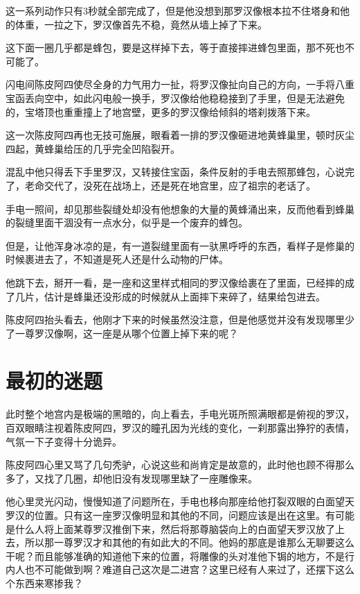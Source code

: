 这一系列动作只有3秒就全部完成了，但是他没想到那罗汉像根本拉不住塔身和他的体重，一拉之下，罗汉像首先不稳，竟然从墙上掉了下来。

这下面一圈几乎都是蜂包，要是这样掉下去，等于直接摔进蜂包里面，那不死也不可能了。

闪电间陈皮阿四使尽全身的力气用力一扯，将罗汉像扯向自己的方向，一手将八重宝函丢向空中，如此闪电般一换手，罗汉像给他稳稳接到了手里，但是无法避免的，宝塔顶也重重撞上了地宫壁，更多的罗汉像给倾斜的塔刹拨落下来。

这一次陈皮阿四再也无技可施展，眼看着一排的罗汉像砸进地黄蜂巢里，顿时灰尘四起，黄蜂巢给压的几乎完全凹陷裂开。

混乱中他只得丢下手里罗汉，又转接住宝函，条件反射的手电去照那蜂包，心说完了，老命交代了，没死在战场上，还是死在地宫里，应了祖宗的老话了。

手电一照间，却见那些裂缝处却没有他想象的大量的黄蜂涌出来，反而他看到蜂巢的裂缝里面干涸没有一点水分，似乎是一个废弃的蜂包。

但是，让他浑身冰凉的是，有一道裂缝里面有一驮黑呼呼的东西，看样子是修巢的时候裹进去了，不知道是死人还是什么动物的尸体。

他跳下去，掰开一看，是一座和这里样式相同的罗汉像给裹在了里面，已经摔的成了几片，估计是蜂巢还没形成的时候就从上面摔下来碎了，结果给包进去。

陈皮阿四抬头看去，他刚才下来的时候虽然没注意，但是他感觉并没有发现哪里少了一尊罗汉像啊，这一座是从哪个位置上掉下来的呢？

\chapter{最初的迷题}

此时整个地宫内是极端的黑暗的，向上看去，手电光斑所照满眼都是俯视的罗汉，百双眼睛注视着陈皮阿四，罗汉的瞳孔因为光线的变化，一刹那露出狰狞的表情，气氛一下子变得十分诡异。

陈皮阿四心里又骂了几句秃驴，心说这些和尚肯定是故意的，此时他也顾不得那么多了，又找了几圈，却他旧没有发现哪里缺了一座雕像来。

他心里灵光闪动，慢慢知道了问题所在，手电也移向那座给他打裂双眼的白面望天罗汉的位置。只有这一座罗汉像明显和其他的不同，问题应该是出在这里。有可能是什么人将上面某尊罗汉推倒下来，然后将那尊脑袋向上的白面望天罗汉放了上去，所以那一尊罗汉才和其他的有如此大的不同。他妈的那底是谁那么无聊要这么干呢？而且能够准确的知道他下来的位置，将雕像的头对准他下锔的地方，不是行内人也不可能做到啊？难道自己这次是二进宫？这里已经有人来过了，还摆下这么个东西来寒掺我？

